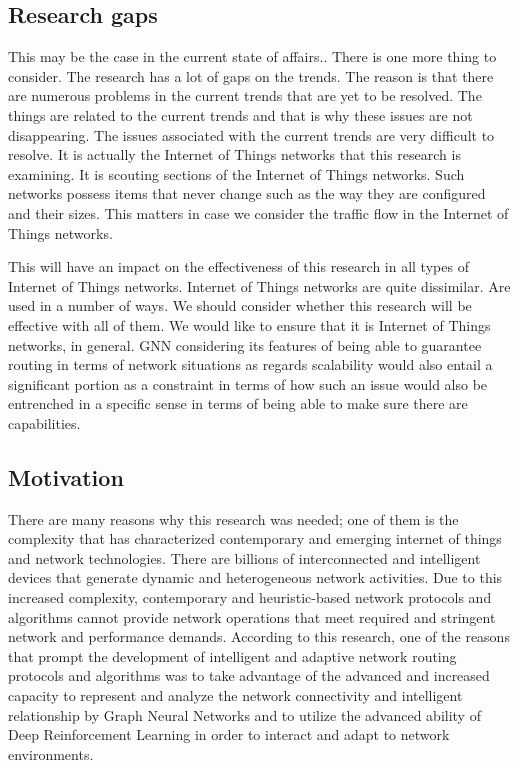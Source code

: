 \documentclass[a4paper,fleqn]{cas-dc}
\numberwithin{equation}{section}
\begin{document}
\subsection{Research gaps}
This may be the case in the current state of affairs.. There is one more thing to consider. The research has a lot of gaps on the trends. The reason is that there are numerous problems in the current trends that are yet to be resolved. The things are related to the current trends and that is why these issues are not disappearing. The issues associated with the current trends are very difficult to resolve. It is actually the Internet of Things networks that this research is examining. It is scouting sections of the Internet of Things networks. Such networks possess items that never change such as the way they are configured and their sizes. This matters in case we consider the traffic flow in the Internet of Things networks.

This will have an impact on the effectiveness of this research in all types of Internet of Things networks. Internet of Things networks are quite dissimilar. Are used in a number of ways. We should consider whether this research will be effective with all of them. We would like to ensure that it is Internet of Things networks, in general. GNN considering its features of being able to guarantee routing in terms of network situations as regards scalability would also entail a significant portion as a constraint in terms of how such an issue would also be entrenched in a specific sense in terms of being able to make sure there are capabilities.
\subsection{Motivation}
There are many reasons why this research was needed; one of them is the complexity that has characterized contemporary and emerging internet of things and network technologies. There are billions of interconnected and intelligent devices that generate dynamic and heterogeneous network activities. Due to this increased complexity, contemporary and heuristic-based network protocols and algorithms cannot provide network operations that meet required and stringent network and performance demands. According to this research, one of the reasons that prompt the development of intelligent and adaptive network routing protocols and algorithms was to take advantage of the advanced and increased capacity to represent and analyze the network connectivity and intelligent relationship by Graph Neural Networks and to utilize the advanced ability of Deep Reinforcement Learning in order to interact and adapt to network environments.
\end{document}
